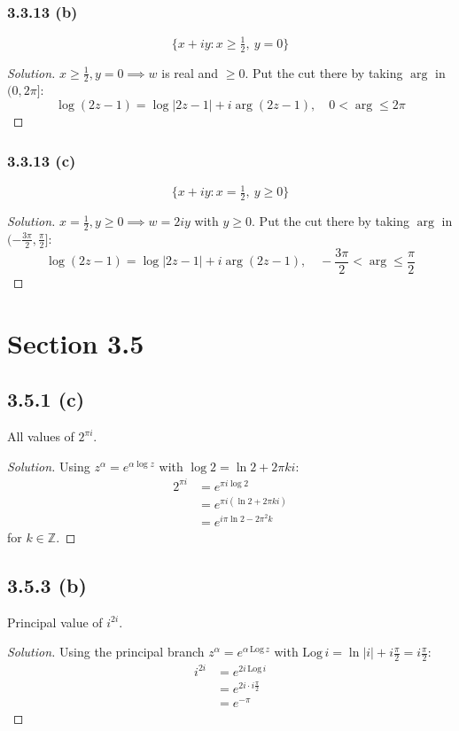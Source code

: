 \documentclass{article}
\newenvironment{solution}{
\begin{proof}[Solution]}{
\end{proof}}
\begin{document}
\subsubsection*{3.3.13 (b)}
\[ \{x + iy : x \ge \tfrac{1}{2},\ y = 0\} \]
\begin{solution}
  $x\geq\frac{1}{2}, y=0 \implies w$ is real and $\geq0$.
  Put the cut there by taking $\arg$ in $(0,2\pi]$:
  \[
    \log(2z-1)=\log|2z-1|+i\arg(2z-1), \quad 0<\arg\leq2\pi
  \]
\end{solution}

\subsubsection*{3.3.13 (c)}
\[ \{x + iy : x = \tfrac{1}{2},\ y \ge 0\} \]
\begin{solution}
  $x=\frac{1}{2}, y\geq0 \implies w=2iy$ with $y\geq0$.
  Put the cut there by taking $\arg$ in $(-\frac{3\pi}{2},\frac{\pi}{2}]$:
  \[
    \log(2z-1)=\log|2z-1|+i\arg(2z-1), \quad -\frac{3\pi}{2}<\arg\leq\frac{\pi}{2}
  \]
\end{solution}

\section*{Section 3.5}

\subsection*{3.5.1 (c)}
All values of $2^{\pi i}$.
\begin{solution}
  Using $z^{\alpha}=e^{\alpha\log z}$ with $\log 2=\ln 2+2\pi ki$:
  \begin{align*}
    2^{\pi i} & = e^{\pi i\log 2} \\
    & = e^{\pi i(\ln 2+2\pi ki)} \\
    & = e^{i\pi\ln 2-2\pi^2 k}
  \end{align*}
  for $k\in\mathbb{Z}$.
\end{solution}

\subsection*{3.5.3 (b)}
Principal value of $i^{2i}$.
\begin{solution}
  Using the principal branch $z^{\alpha}=e^{\alpha\,\text{Log}\, z}$ with $\text{Log}\, i=\ln|i|+i\frac{\pi}{2}=i\frac{\pi}{2}$:
  \begin{align*}
    i^{2i} & = e^{2i\,\text{Log}\, i} \\
    & = e^{2i\cdot i\frac{\pi}{2}} \\
    & = e^{-\pi}
  \end{align*}
\end{solution}
\end{document}
